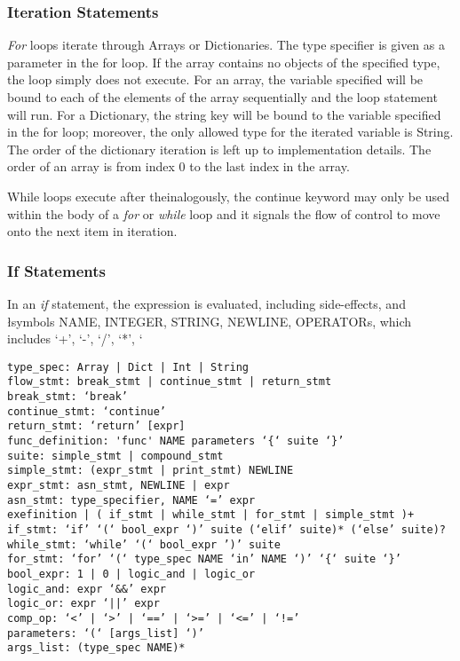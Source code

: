 \documentclass[12pt]{article}
\begin{document}
\subsubsection{Iteration Statements}

\textit{For} loops iterate through Arrays or Dictionaries.  The type specifier is given as a parameter in the for loop.  If the array contains no objects of the specified type, the loop simply does not execute.  For an array, the variable specified will be bound to each of the elements of the array sequentially and the loop statement will run.  For a Dictionary, the string key will be bound to the variable specified in the for loop; moreover, the only allowed type for the iterated variable is String.  The order of the dictionary iteration is left up to implementation details.  The order of an array is from index 0 to the last index in the array.

While loops execute after theinalogously, the continue keyword may only be used within the body of a \textit{for} or \textit{while} loop and it signals the flow of control to move onto the next item in iteration. 

\subsubsection{If Statements}

In an \textit{if} statement, the expression is evaluated, including side-effects, and \l symbols NAME, INTEGER, STRING, NEWLINE, OPERATORs, which includes ‘+’, ‘-’, ‘/’, ‘*’, ‘%

\begin{lstlisting}
type_spec: Array | Dict | Int | String
flow_stmt: break_stmt | continue_stmt | return_stmt
break_stmt: ‘break’
continue_stmt: ‘continue’
return_stmt: ‘return’ [expr]
func_definition: 'func' NAME parameters ‘{‘ suite ‘}’
suite: simple_stmt | compound_stmt
simple_stmt: (expr_stmt | print_stmt) NEWLINE
expr_stmt: asn_stmt, NEWLINE | expr 
asn_stmt: type_specifier, NAME ‘=’ expr
exefinition | ( if_stmt | while_stmt | for_stmt | simple_stmt )+
if_stmt: ‘if’ ‘(‘ bool_expr ‘)’ suite (‘elif’ suite)* (‘else’ suite)?
while_stmt: ‘while’ ‘(‘ bool_expr ’)’ suite
for_stmt: ‘for’ ‘(‘ type_spec NAME ‘in’ NAME ‘)’ ‘{‘ suite ‘}’
bool_expr: 1 | 0 | logic_and | logic_or 
logic_and: expr ‘&&’ expr 
logic_or: expr ‘||’ expr 
comp_op: ‘<’ | ‘>’ | ‘==’ | ‘>=’ | ‘<=’ | ‘!=’
parameters: ‘(‘ [args_list] ‘)’
args_list: (type_spec NAME)*
\end{lstlisting}
\end{document}
